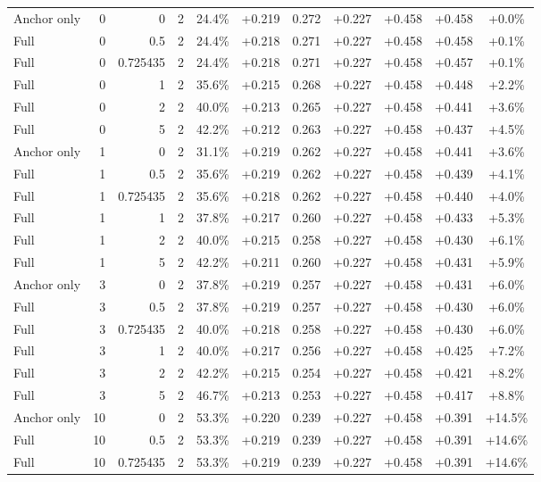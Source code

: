 \begin{table}[htbp]
\begin{tabular}{lrrrccccccc}
Anchor only & 0 & 0 & 2 & 24.4\% & +0.219 & 0.272 & +0.227 & +0.458 & +0.458 & +0.0\% \\
Full & 0 & 0.5 & 2 & 24.4\% & +0.218 & 0.271 & +0.227 & +0.458 & +0.458 & +0.1\% \\
Full & 0 & 0.725435 & 2 & 24.4\% & +0.218 & 0.271 & +0.227 & +0.458 & +0.457 & +0.1\% \\
Full & 0 & 1 & 2 & 35.6\% & +0.215 & 0.268 & +0.227 & +0.458 & +0.448 & +2.2\% \\
Full & 0 & 2 & 2 & 40.0\% & +0.213 & 0.265 & +0.227 & +0.458 & +0.441 & +3.6\% \\
Full & 0 & 5 & 2 & 42.2\% & +0.212 & 0.263 & +0.227 & +0.458 & +0.437 & +4.5\% \\
Anchor only & 1 & 0 & 2 & 31.1\% & +0.219 & 0.262 & +0.227 & +0.458 & +0.441 & +3.6\% \\
Full & 1 & 0.5 & 2 & 35.6\% & +0.219 & 0.262 & +0.227 & +0.458 & +0.439 & +4.1\% \\
Full & 1 & 0.725435 & 2 & 35.6\% & +0.218 & 0.262 & +0.227 & +0.458 & +0.440 & +4.0\% \\
Full & 1 & 1 & 2 & 37.8\% & +0.217 & 0.260 & +0.227 & +0.458 & +0.433 & +5.3\% \\
Full & 1 & 2 & 2 & 40.0\% & +0.215 & 0.258 & +0.227 & +0.458 & +0.430 & +6.1\% \\
Full & 1 & 5 & 2 & 42.2\% & +0.211 & 0.260 & +0.227 & +0.458 & +0.431 & +5.9\% \\
Anchor only & 3 & 0 & 2 & 37.8\% & +0.219 & 0.257 & +0.227 & +0.458 & +0.431 & +6.0\% \\
Full & 3 & 0.5 & 2 & 37.8\% & +0.219 & 0.257 & +0.227 & +0.458 & +0.430 & +6.0\% \\
Full & 3 & 0.725435 & 2 & 40.0\% & +0.218 & 0.258 & +0.227 & +0.458 & +0.430 & +6.0\% \\
Full & 3 & 1 & 2 & 40.0\% & +0.217 & 0.256 & +0.227 & +0.458 & +0.425 & +7.2\% \\
Full & 3 & 2 & 2 & 42.2\% & +0.215 & 0.254 & +0.227 & +0.458 & +0.421 & +8.2\% \\
Full & 3 & 5 & 2 & 46.7\% & +0.213 & 0.253 & +0.227 & +0.458 & +0.417 & +8.8\% \\
Anchor only & 10 & 0 & 2 & 53.3\% & +0.220 & 0.239 & +0.227 & +0.458 & +0.391 & +14.5\% \\
Full & 10 & 0.5 & 2 & 53.3\% & +0.219 & 0.239 & +0.227 & +0.458 & +0.391 & +14.6\% \\
Full & 10 & 0.725435 & 2 & 53.3\% & +0.219 & 0.239 & +0.227 & +0.458 & +0.391 & +14.6\% \\

\end{tabular}
\end{table}
